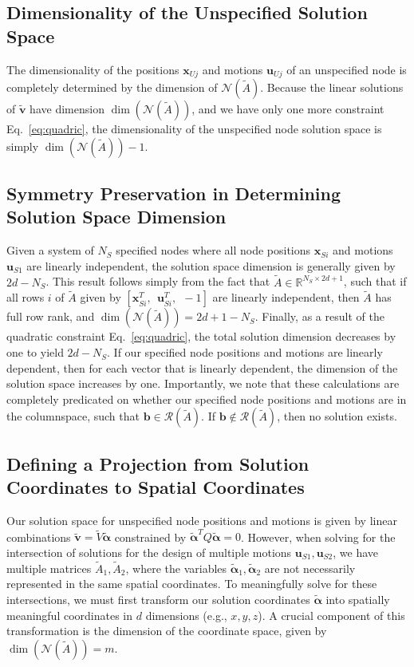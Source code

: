 \documentclass[%
preprint,
 amsmath,amssymb,
 aps,
]{revtex4-1}
\newcommand{\mc}{\mathcal}
\newcommand{\real}{\mathbb{R}}
\begin{document}
\subsection{Dimensionality of the Unspecified Solution Space}
The dimensionality of the positions $\bm{x}_{Uj}$ and motions $\bm{u}_{Uj}$ of an unspecified node is completely determined by the dimension of $\mc N(\tilde{A})$. Because the linear solutions of $\bm{\tilde{v}}$ have dimension $\dim(\mc N(\tilde{A}))$, and we have only one more constraint Eq.~\ref{eq:quadric}, the dimensionality of the unspecified node solution space is simply $\dim(\mc N(\tilde{A})) - 1$.



\subsection{Symmetry Preservation in Determining Solution Space Dimension}
Given a system of $N_S$ specified nodes where all node positions $\bm{x}_{Si}$ and motions $\bm{u}_{S1}$ are linearly independent, the solution space dimension is generally given by $2d - N_S$. This result follows simply from the fact that $\tilde{A} \in \real^{N_S \times 2d+1}$, such that if all rows $i$ of $\tilde{A}$ given by $[\bm{x}_{Si}^T,~~ \bm{u}_{Si}^T,~~ -1]$ are linearly independent, then $\tilde{A}$ has full row rank, and $\dim(\mc N(\tilde{A})) = 2d+1 - N_S$. Finally, as a result of the quadratic constraint Eq.~\ref{eq:quadric}, the total solution dimension decreases by one to yield $2d - N_S$. If our specified node positions and motions are linearly dependent, then for each vector that is linearly dependent, the dimension of the solution space increases by one. Importantly, we note that these calculations are completely predicated on whether our specified node positions and motions are in the columnspace, such that $\bm{b} \in \mc R(\tilde{A})$. If $\bm{b} \notin \mc R(\tilde{A})$, then no solution exists. 



\subsection{Defining a Projection from Solution Coordinates to Spatial Coordinates}
Our solution space for unspecified node positions and motions is given by linear combinations $\bm{\tilde{v}} = \tilde{V} \bm{\tilde{\alpha}}$ constrained by $\bm{\tilde{\alpha}}^T Q \bm{\tilde{\alpha}} = 0$. However, when solving for the intersection of solutions for the design of multiple motions $\bm{u}_{S1}, \bm{u}_{S2}$, we have multiple matrices $\tilde{A}_1, \tilde{A}_2$, where the variables $\bm{\tilde{\alpha}}_1, \bm{\tilde{\alpha}}_2$ are not necessarily represented in the same spatial coordinates. To meaningfully solve for these intersections, we must first transform our solution coordinates $\bm{\tilde{\alpha}}$ into spatially meaningful coordinates in $d$ dimensions (e.g., $x, y, z$). A crucial component of this transformation is the dimension of the coordinate space, given by $\dim(\mc N(\tilde{A})) = m$.
\end{document}
